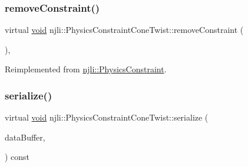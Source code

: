 \mbox{\label{classnjli_1_1_physics_constraint_cone_twist_a975d5736a7ef4c440f9138dfdfcec357}} 
\subsubsection{\texorpdfstring{remove\+Constraint()}{removeConstraint()}}
{\footnotesize\ttfamily virtual \mbox{\hyperlink{_thread_8h_af1e856da2e658414cb2456cb6f7ebc66}{void}} njli\+::\+Physics\+Constraint\+Cone\+Twist\+::remove\+Constraint (\begin{DoxyParamCaption}{ }\end{DoxyParamCaption})\hspace{0.3cm}{\ttfamily [protected]}, {\ttfamily [virtual]}}



Reimplemented from \mbox{\hyperlink{classnjli_1_1_physics_constraint_ae3dc487da3069d859bb4ddb05aa2e779}{njli\+::\+Physics\+Constraint}}.

\mbox{\label{classnjli_1_1_physics_constraint_cone_twist_a0525276852c678e2dcda35d864d035db}} 
\subsubsection{\texorpdfstring{serialize()}{serialize()}}
{\footnotesize\ttfamily virtual \mbox{\hyperlink{_thread_8h_af1e856da2e658414cb2456cb6f7ebc66}{void}} njli\+::\+Physics\+Constraint\+Cone\+Twist\+::serialize (\begin{DoxyParamCaption}\item[{\mbox{\hyperlink{_thread_8h_af1e856da2e658414cb2456cb6f7ebc66}{void}} $\ast$}]{data\+Buffer,  }\item[{bt\+Serializer $\ast$}]{ }\end{DoxyParamCaption}) const\hspace{0.3cm}{\ttfamily [virtual]}}



